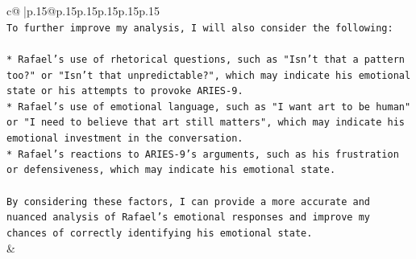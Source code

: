 \documentclass{article}
\begin{document}
{\begin{supertabular}{c@{$\;$}|p{.15\linewidth}@{}p{.15\linewidth}p{.15\linewidth}p{.15\linewidth}p{.15\linewidth}p{.15\linewidth}}
{{{\\ 
\texttt{To further improve my analysis, I will also consider the following:} \\
\\ 
\texttt{* Rafael's use of rhetorical questions, such as "Isn't that a pattern too?" or "Isn't that unpredictable?", which may indicate his emotional state or his attempts to provoke ARIES{-}9.} \\
\texttt{* Rafael's use of emotional language, such as "I want art to be human" or "I need to believe that art still matters", which may indicate his emotional investment in the conversation.} \\
\texttt{* Rafael's reactions to ARIES{-}9's arguments, such as his frustration or defensiveness, which may indicate his emotional state.} \\
\\ 
\texttt{By considering these factors, I can provide a more accurate and nuanced analysis of Rafael's emotional responses and improve my chances of correctly identifying his emotional state.} \\
            }
        }
    }
    & \\ \\

\end{supertabular}
}
\end{document}
